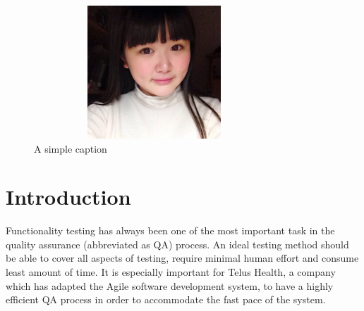 \documentclass[12pt]{article}
\begin{document}
\begin{figure}[ht!]
\centering
\includegraphics[width=90mm,height=5cm,keepaspectratio]{img/aaa.jpg}
\caption{A simple caption}
\label{overflow}
\end{figure}


\newpage

\toc


\section{Introduction}

Functionality testing has always been one of the most important task in the quality assurance (abbreviated as QA) process. An ideal testing method should be able to cover all aspects of testing, require minimal human effort and consume least amount of time. It is especially important for Telus Health, a company which has adapted the Agile software development system, to have a highly efficient QA process in order to accommodate the fast pace of the system.\\
\end{document}
